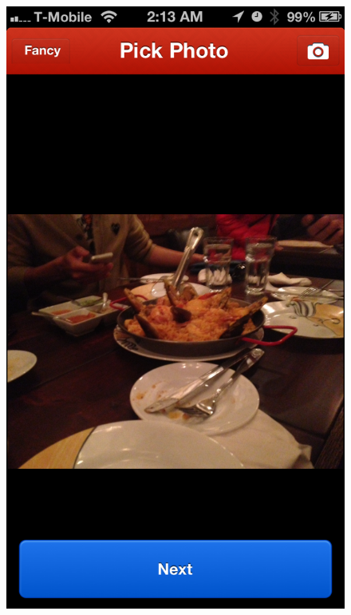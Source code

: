 \begin{figure}
{	\includegraphics[width=\figwidth, totalheight=\figheight, keepaspectratio]{./screenshots/home-didpick.png}} \hfill
\end{figure}
